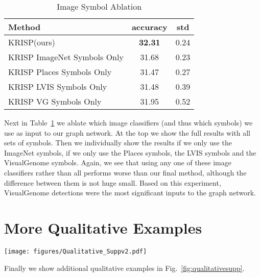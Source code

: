 \documentclass[final]{cvpr}
\providecommand{\ModelName}{KRISP\xspace}
\providecommand{\MMBERTBase}{Multi-modal BERT\xspace}
\begin{document}
\begin{table}[h]
\begin{center}
\begin{tabular}{@{}lcc@{}}
\toprule
Method & accuracy & std\\ \midrule
\ModelName (ours) & \bf{32.31} & 0.24 \\
\ModelName ImageNet Symbols Only & 31.68 & 0.23 \\
\ModelName Places Symbols Only & 31.47 & 0.27 \\
\ModelName LVIS Symbols Only & 31.48 & 0.39 \\
\ModelName VG Symbols Only & 31.95 & 0.52\\
\bottomrule
\end{tabular}
\end{center}
\caption{Image Symbol Ablation}
\label{table:imgablation}
\end{table}

Next in Table~\ref{table:imgablation} we ablate which image classifiers (and thus which symbols) we use as input to our graph network. At the top we show the full results with all  sets of symbols. Then we individually show the results if we only use the ImageNet symbols, if we only use the Places symbols, the LVIS symbols and the VisualGenome symbols. Again, we see that using any one of these image classifiers rather than all  performs worse than our final method, although the difference between them is not huge small. Based on this experiment, VisualGenome detections were the most significant inputs to the graph network.

\section{More Qualitative Examples}
\label{appx:qual}
\begin{figure*}[t]
\centering
\texttt{[image: figures/Qualitative\_Suppv2.pdf]}
\caption{More qualitative examples from \ModelName. Showing predictions by our model and the implicit knowledge baseline \MMBERTBase. We show the question, image, and answers given by both models. We also show knowledge in the graph related to the question, answers or image that seemed most relevant.}
\label{fig:qualitativesupp}
\end{figure*}

Finally we show additional qualitative examples in Fig.~\ref{fig:qualitativesupp}. 
\end{document}

